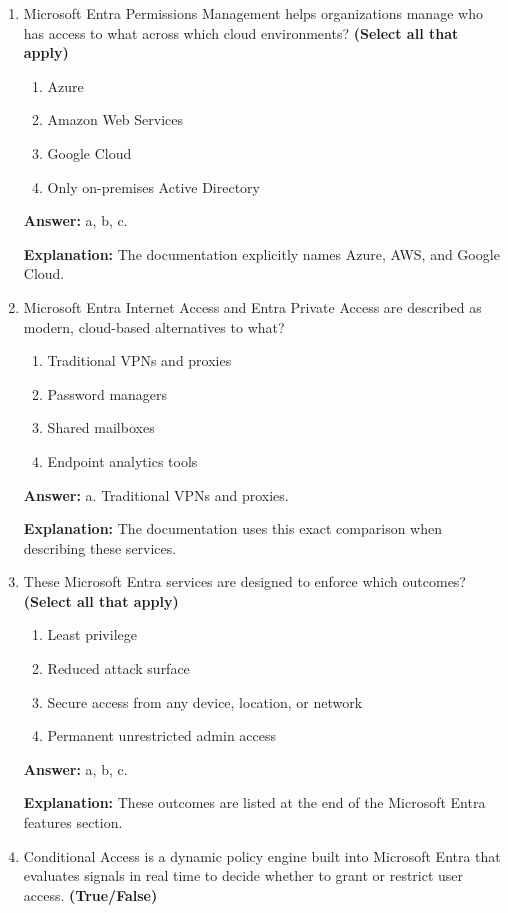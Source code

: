 \documentclass[10pt]{article}
\begin{document}
\begin{enumerate}[leftmargin=*]
\textbf{Explanation:} This is the exact purpose assigned to Verified ID in the feature list.

\item Microsoft Entra Permissions Management helps organizations manage who has access to what across which cloud environments? \textbf{(Select all that apply)}
\begin{enumerate}[label=\alph*., leftmargin=1.5em]
\item Azure
\item Amazon Web Services
\item Google Cloud
\item Only on-premises Active Directory
\end{enumerate}
\textbf{Answer:} a, b, c.

\textbf{Explanation:} The documentation explicitly names Azure, AWS, and Google Cloud.

\item Microsoft Entra Internet Access and Entra Private Access are described as modern, cloud-based alternatives to what?
\begin{enumerate}[label=\alph*., leftmargin=1.5em]
\item Traditional VPNs and proxies
\item Password managers
\item Shared mailboxes
\item Endpoint analytics tools
\end{enumerate}
\textbf{Answer:} a. Traditional VPNs and proxies.

\textbf{Explanation:} The documentation uses this exact comparison when describing these services.

\item These Microsoft Entra services are designed to enforce which outcomes? \textbf{(Select all that apply)}
\begin{enumerate}[label=\alph*., leftmargin=1.5em]
\item Least privilege
\item Reduced attack surface
\item Secure access from any device, location, or network
\item Permanent unrestricted admin access
\end{enumerate}
\textbf{Answer:} a, b, c.

\textbf{Explanation:} These outcomes are listed at the end of the Microsoft Entra features section.

\item Conditional Access is a dynamic policy engine built into Microsoft Entra that evaluates signals in real time to decide whether to grant or restrict user access. \textbf{(True/False)}


\end{enumerate}
\end{document}
